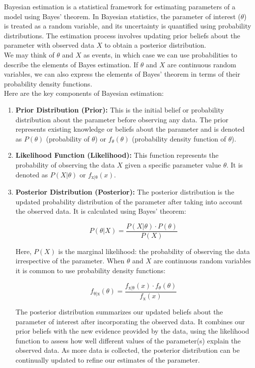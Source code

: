 \documentclass[12pt]{book}
\theoremstyle{definition}
\begin{document}
Bayesian estimation is a statistical framework for estimating parameters of a model using Bayes' theorem. In Bayesian statistics, the parameter of interest (\( \theta\)) is treated as a random variable, and its uncertainty is quantified using probability distributions. The estimation process involves updating prior beliefs about the parameter with observed data \(X\) to obtain a posterior distribution.\\

We may think of \(\theta\) and \(X\) as events, in which case we can use probabilities to describe the elements of Bayes estimation. If \(\theta\) and \(X\) are continuous random variables, we can also express the elements of Bayes' theorem in terms of their probability density functions.\\

Here are the key components of Bayesian estimation:

\begin{enumerate}
    \item \textbf{Prior Distribution (Prior):} This is the initial belief or probability distribution about the parameter before observing any data. The prior represents existing knowledge or beliefs about the parameter and is denoted as \( P(\theta) \) (probability of $\theta$) or \(f_\theta(\theta)\) (probability density function of $\theta$).
    \item \textbf{Likelihood Function (Likelihood):} This function represents the probability of observing the data \(X\) given a specific parameter value $\theta$. It is denoted as \( P(X | \theta) \) or \( f_\mathrm{{x}|\theta}({x})\).
    \item \textbf{Posterior Distribution (Posterior):} The posterior distribution is the updated probability distribution of the parameter after taking into account the observed data. It is calculated using Bayes' theorem:

   \[ P(\theta | X) = \frac{P(X | \theta) \cdot P(\theta)}{P(X)} \]

    Here, \( P(X) \) is the marginal likelihood: the probability of observing the data irrespective of the parameter. When \(\theta\) and \(X\) are continuous random variables it is common to use probability density functions:

       \[ f_\mathrm{\theta | x} (\theta) = \frac{f_\mathrm{x | \theta} (x) \cdot f_\theta (\theta)}{f_\mathrm{x}(x)} \]

The posterior distribution summarizes our updated beliefs about the parameter of interest after incorporating the observed data. It combines our prior beliefs with the new evidence provided by the data, using the likelihood function to assess how well different values of the parameter(s) explain the observed data. As more data is collected, the posterior distribution can be continually updated to refine our estimates of the parameter.

\end{enumerate}
\end{document}
